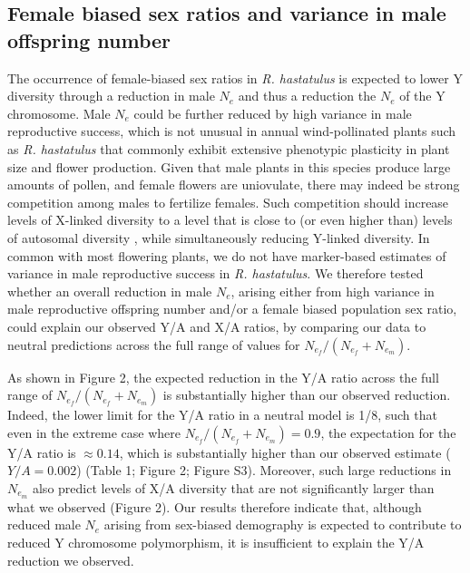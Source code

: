 \documentclass[9pt,twocolumn,twoside]{gsajnl}
\begin{document}
\subsection*{Female biased sex ratios and variance in male offspring number}
The occurrence of female-biased sex ratios in \textit{R. hastatulus} is expected to lower Y diversity through a reduction in male $N_{e}$ and thus a reduction the $N_{e}$ of the Y chromosome. Male $N_{e}$ could be further reduced by high variance in male reproductive success, which is not unusual in annual wind-pollinated plants such as \textit{R. hastatulus} that commonly exhibit extensive phenotypic plasticity in plant size and flower production. Given that male plants in this species produce large amounts of pollen, and female flowers are uniovulate, there may indeed be strong competition among males to fertilize females. Such competition should increase levels of X-linked diversity to a level that is close to (or even higher than) levels of autosomal diversity \citep{caballero1995}, while simultaneously reducing Y-linked diversity. In common with most flowering plants, we do not have marker-based estimates of variance in male reproductive success in \textit{R. hastatulus}. We therefore tested whether an overall reduction in male $N_{e}$, arising either from high variance in male reproductive offspring number and/or a female biased population sex ratio, could explain our observed Y/A and X/A ratios, by comparing our data to neutral predictions across the full range of values for $N_{e}_{f}/(N_{e}_{f} + N_{e}_{m})$.

As shown in Figure 2, the expected reduction in the Y/A ratio across the full range of $N_{e}_{f}/(N_{e}_{f} + N_{e}_{m})$ is substantially higher than our observed reduction. Indeed, the lower limit for the Y/A ratio in a neutral model is 1/8, such that even in the extreme case where $N_{e}_{f}/(N_{e}_{f} + N_{e}_{m}) = 0.9$, the expectation for the Y/A ratio is $\approx 0.14$, which is substantially higher than our observed estimate ($Y/A= 0.002$) (Table 1; Figure 2; Figure S3). Moreover, such large reductions in $N_{e}_{m}$ also predict levels of X/A diversity that are not significantly larger than what we observed (Figure 2). Our results therefore indicate that, although reduced male $N_{e}$ arising from sex-biased demography is expected to contribute to reduced Y chromosome polymorphism, it is insufficient to explain the Y/A reduction we observed.
\end{document}
